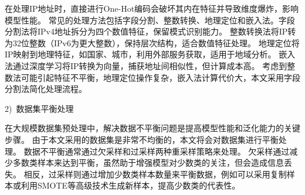 在处理IP地址时，直接进行One-Hot编码会破坏其内在特征并导致维度爆炸，影响模型性能。
常见的处理方法包括字段分割、整数转换、地理定位和嵌入法。字段分割法将IPv4地址拆分为四个数值特征，保留模式识别能力。
整数转换法将IP转为32位整数（IPv6为更大整数），保持层次结构，适合数值特征处理。
地理定位将IP映射到地理特征，如国家、城市，利用外部服务获取，适用于地域分析。
嵌入法通过深度学习将IP转换为向量，捕获地址间相似性，但计算成本高。
考虑到整数法可能引起特征不平衡，地理定位操作复杂，嵌入法计算代价大，本文采用字段分割法简化处理流程。\par

2)~数据集平衡处理\par
在大规模数据集预处理中，解决数据不平衡问题是提高模型性能和泛化能力的关键步骤。
由于本文采用的数据集是非常不均衡的，本文将会对数据集进行平衡处理。
数据不平衡通常通过欠采样和过采样两种重采样策略来处理。
欠采样通过减少多数类样本来达到平衡，虽然助于增强模型对少数类的关注，但会造成信息丢失。
相反，过采样则通过增加少数类样本数量来平衡数据，例如可以采用复制样本或利用SMOTE等高级技术生成新样本，提高少数类的代表性。\par

